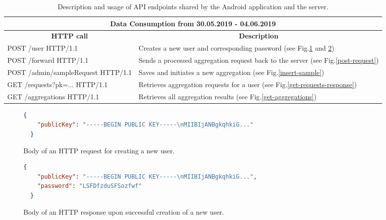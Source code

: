 \begin{table}[h]

  \begin{tabularx}{\textwidth}{|l|X|}
    \hline
    \multicolumn{2}{|c|}{\textbf{Data Consumption from 30.05.2019 - 04.06.2019}}                                                                              \\ \hline
     \multicolumn{1}{|c|}{\textbf{HTTP call}}                 & \multicolumn{1}{c|}{\textbf{Description}}                                                                               \\ \hline
    POST /user HTTP/1.1                & Creates a new user and corresponding password (see Fig.\ref{post-user-request} and \ref{post-user-response}) \\ \hline
    POST /forward HTTP/1.1             & Sends a processed aggregation request back to the server (see Fig.\ref{post-request})              \\ \hline
    POST /admin/sampleRequest HTTP/1.1 & Saves and initiates a new aggregation (see Fig.\ref{insert-sample})                                          \\ \hline
    GET /requests?pk=... HTTP/1.1      & Retrieves aggregation requests for a user (see Fig.\ref{get-requests-response})                    \\ \hline
    GET /aggregations HTTP/1.1         & Retrieves all aggregation results (see Fig.\ref{get-aggregations})                                 \\ \hline
  \end{tabularx}
  \caption{Description and usage of API endpoints shared by the Android application and the server.}
  \label{api-endpoints}
\end{table}

\begin{figure}[!h]
  \begin{lstlisting}[language=json,firstnumber=1]
  {
    "publicKey": "-----BEGIN PUBLIC KEY-----\nMIIBIjANBgkqhkiG..."
  }
  \end{lstlisting}
  \caption{Body of an HTTP request for creating a new user.}
  \label{post-user-request}
\end{figure}

\begin{figure}[h!]
  \begin{lstlisting}[language=json,firstnumber=1]
  {
    "publicKey": "-----BEGIN PUBLIC KEY-----\nMIIBIjANBgkqhkiG...",
    "password": "LSFDfzduSFSozfwf"
  }
  \end{lstlisting}
  \caption{Body of an HTTP response upon successful creation of a new user.}
  \label{post-user-response}
\end{figure}

